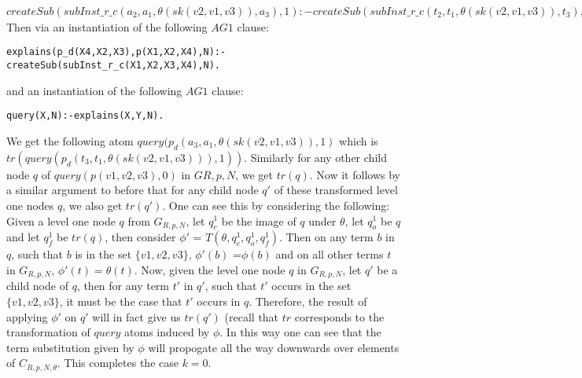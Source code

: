 \documentclass[sigconf]{acmart}
\begin{document}
$createSub(subInst\_r\_c(a_{2},a_{1},\theta(sk(v2,v1,v3)),a_{3}),1):-createSub(subInst\_r\_c(t_{2},t_{1},\theta(sk(v2,v1,v3)),t_{3}),1),q_{f}.$\\
Then via an instantiation of the following $AG1$ clause:
\begin{verbatim}
explains(p_d(X4,X2,X3),p(X1,X2,X4),N):-createSub(subInst_r_c(X1,X2,X3,X4),N).    
\end{verbatim}
and an instantiation of the following $AG1$ clause:
\begin{verbatim}
query(X,N):-explains(X,Y,N).    
\end{verbatim}
We get the following atom $query(p_{d}(a_{3},a_{1},\theta(sk(v2,v1,v3)),1)$ which is $tr(query(p_{d}(t_{3},t_{1},\theta(sk(v2,v1,v3))),1))$. Similarly for any other child node $q$ of $query(p(v1,v2,v3),0)$ in $G{R,p,N}$, we get $tr(q)$. Now it follows by a similar argument to before that for any child node $q'$ of these transformed level one nodes $q$, we also get $tr(q')$. One can see this by considering the following: Given a level one node $q$ from $G_{R,p,N}$, let $q_{c}^{1}$ be the image of $q$ under $\theta$, let $q_{o}^{1}$ be $q$ and let $q_{f}^{1}$ be $tr(q)$, then consider $\phi'$ = $T(\theta, q_{c}^{1},q_{o}^{1},q_{f}^{1})$. Then on any term $b$ in $q$, such that $b$ is in the set $\{v1,v2,v3\}$, $\phi'(b)$ =$\phi(b)$ and on all other terms $t$ in $G_{R,p,N}$, $\phi'(t)=\theta(t)$. Now, given the level one node $q$ in $G_{R,p,N}$, let $q'$ be a child node of $q$, then for any term $t'$ in $q'$, such that $t'$ occurs in the set $\{v1,v2,v3\}$, it must be the case that $t'$ occurs in $q$. Therefore, the result of applying $\phi'$ on $q'$ will in fact give us $tr(q')$ (recall that $tr$ corresponds to the transformation of $query$ atoms induced by $\phi$. In this way one can see that the term substitution given by $\phi$ will propogate all the way downwards over elements of $C_{R,p,N,\theta}$. This completes the case $k=0$. 
\end{document}
